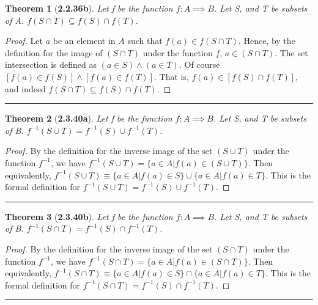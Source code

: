 \documentclass[a4paper, 12pt]{article}
\theoremstyle{plain}
\newtheorem*{theorem*}{Theorem}
\begin{document}
\pagebreak


\begin{theorem*}[\textbf{2.2.36b}]
    Let f be the function $f: A \implies B$. Let S, and T be subsets of A. 
    $f(S \cap T) \subseteq f(S) \cap f(T)$.
\end{theorem*}

\begin{proof}
    Let $a$ be an element in $A$ such that $f(a) \in f(S \cap T)$. Hence, by the definition 
    for the image of $(S \cap T)$ under the function $f$, $a \in (S \cap T)$. The set 
    intersection is defined as $(a \in S) \land (a \in T)$. Of course \newline 
    $[f(a) \in f(S)] \land [f(a) \in f(T)]$. That is, $f(a) \in [f(S) \cap f(T)]$, and indeed 
    $f(S \cap T) \subseteq f(S) \cap f(T)$.
\end{proof}
\begin{center}
    \rule{5.4in}{1pt}
\end{center}


\begin{theorem*}[\textbf{2.3.40a}]
    Let f be the function $f: A \implies B$. Let S, and T be subsets of B. 
    $f^{-1}(S \cup T) = f^{-1}(S) \cup f^{-1}(T)$.
\end{theorem*}

\begin{proof}
    By the definition for the inverse image of the set $(S \cup T)$ under the function 
    $f^{-1}$, we have $f^{-1}(S \cup T) = \{a \in A | f(a) \in (S \cup T)\}$. Then 
    equivalently, 
    $f^{-1}(S \cup T) \equiv \{a \in A | f(a) \in S\} \cup \{a \in A | f(a) \in T\}$. 
    This is the formal definition for $f^{-1}(S \cup T) = f^{-1}(S) \cup f^{-1}(T)$.
\end{proof}
\begin{center}
    \rule{5.4in}{1pt}
\end{center}


\begin{theorem*}[\textbf{2.3.40b}]
    Let f be the function $f: A \implies B$. Let S, and T be subsets of B. 
    $f^{-1}(S \cap T) = f^{-1}(S) \cap f^{-1}(T)$.
\end{theorem*}

\begin{proof}
    By the definition for the inverse image of the set $(S \cap T)$ under the function 
    $f^{-1}$, we have $f^{-1}(S \cap T) = \{a \in A | f(a) \in (S \cap T)\}$. Then 
    \newline equivalently, 
    $f^{-1}(S \cap T) \equiv \{a \in A | f(a) \in S\} \cap \{a \in A | f(a) \in T\}$. This 
    is the formal definition for $f^{-1}(S \cap T) = f^{-1}(S) \cap f^{-1}(T)$.
\end{proof}
\begin{center}
    \rule{5.4in}{1pt}
\end{center}
\end{document}
